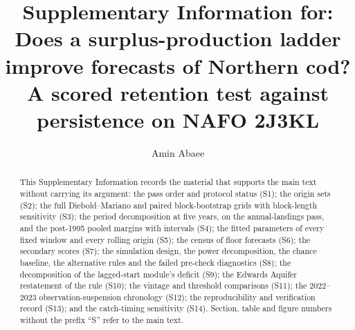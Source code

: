 \documentclass[preprint,11pt,authoryear]{elsarticle}
\theoremstyle{remark}
\begin{document}
\begin{frontmatter}
\title{Supplementary Information for:\\ Does a surplus-production ladder improve forecasts of Northern cod? A scored retention test against persistence on NAFO 2J3KL}
\author[1]{Amin Abaee}
\begin{abstract}
This Supplementary Information records the material that supports the main text without carrying its argument: the pass order and protocol status (S1); the origin sets (S2); the full Diebold--Mariano and paired block-bootstrap grids with block-length sensitivity (S3); the period decomposition at five years, on the annual-landings pass, and the post-1995 pooled margins with intervals (S4); the fitted parameters of every fixed window and every rolling origin (S5); the census of floor forecasts (S6); the secondary scores (S7); the simulation design, the power decomposition, the chance baseline, the alternative rules and the failed pre-check diagnostics (S8); the decomposition of the lagged-start module's deficit (S9); the Edwards Aquifer restatement of the rule (S10); the vintage and threshold comparisons (S11); the 2022--2023 observation-suspension chronology (S12); the reproducibility and verification record (S13); and the catch-timing sensitivity (S14). Section, table and figure numbers without the prefix ``S'' refer to the main text.
\end{abstract}
\end{frontmatter}
\end{document}
